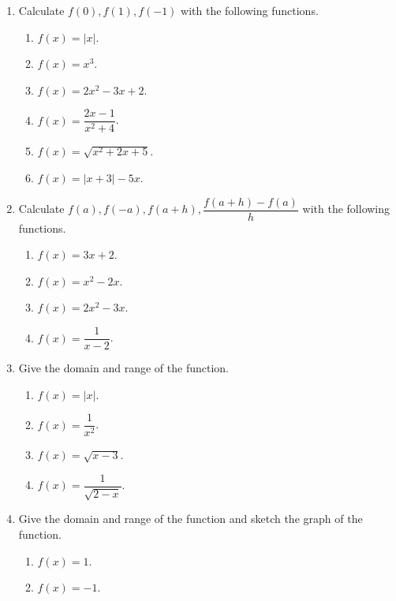 \documentclass[11pt]{book}
\begin{document}
\begin{enumerate}[label=\arabic*.]
    \item Calculate $f(0), f(1), f(-1)$ with the following functions.
    \begin{multicols}{3}
        \begin{enumerate}
            \item $f(x)=|x|$.
            \item $f(x)=x^3$.
            \item $f(x)=2x^2-3x+2$.
            \item $f(x)=\dfrac{2x-1}{x^2+4}$.
            \item $f(x)=\sqrt{x^2+2x+5}$.
            \item $f(x)=|x+3|-5x$.
        \end{enumerate}
    \end{multicols}
    \item Calculate $f(a), f(-a), f(a+h), \dfrac{f(a+h)-f(a)}{h}$ with the following functions.
    \begin{multicols}{2}
        \begin{enumerate}
            \item $f(x)=3x+2$.
            \item $f(x)=x^2-2x$.
            \item $f(x)=2x^2-3x$.
            \item $f(x)=\dfrac{1}{x-2}$.
        \end{enumerate}
    \end{multicols}
    \item Give the domain and range of the function.
    \begin{multicols}{2}
        \begin{enumerate}
            \item $f(x)=|x|$.
            \item $f(x)=\dfrac{1}{x^2}$.
            \item $f(x)=\sqrt{x-3}$.
            \item $f(x)=\dfrac{1}{\sqrt{2-x}}$.
        \end{enumerate}
    \end{multicols}
    \item Give the domain and range of the function and sketch the graph of the function.
    \begin{multicols}{2}
        \begin{enumerate}
            \item $f(x)=1$.
            \item $f(x)=-1$.

\end{enumerate}
\end{multicols}
\end{enumerate}
\end{document}
